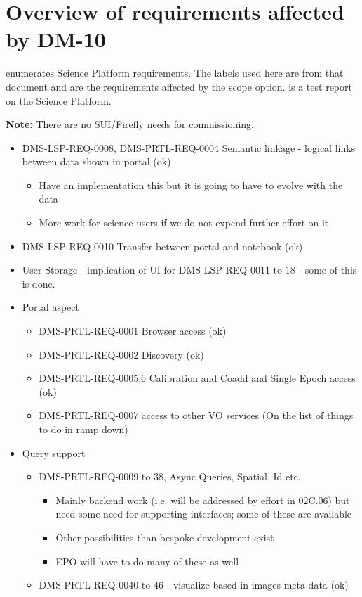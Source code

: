 \section { Overview of requirements affected by DM-10}\label{sect:reqs}
 enumerates Science Platform requirements.
The labels used here are from that document and are the requirements affected by the scope option.
 is a test report on the Science Platform.

\textbf{Note:} There are no SUI/Firefly needs for commissioning.
\begin{itemize}
\item DMS-LSP-REQ-0008, DMS-PRTL-REQ-0004 Semantic linkage - logical links between data shown in portal (ok)
\begin{itemize}
\item Have an implementation this but it is going to have to evolve with the data
\item More work for science users if we do not expend further effort on it
\end{itemize}

\item DMS-LSP-REQ-0010 Transfer between portal and notebook (ok)
\item User Storage - implication of UI for DMS-LSP-REQ-0011 to 18 - some of this is done.
\item Portal aspect
\begin{itemize}
\item DMS-PRTL-REQ-0001 Browser access (ok)
\item DMS-PRTL-REQ-0002 Discovery (ok)
\item DMS-PRTL-REQ-0005,6 Calibration and Coadd and Single Epoch access (ok)
\item DMS-PRTL-REQ-0007 access to other VO services (On the list of things to do in ramp down)
\end{itemize}

\item Query support
\begin{itemize}
\item DMS-PRTL-REQ-0009 to 38, Async Queries, Spatial, Id etc.
\begin{itemize}
\item Mainly backend work (i.e. will be addressed by effort in 02C.06) but need some need for supporting interfaces; some of these are available
\item Other possibilities than bespoke development exist
\item EPO will have to do many of these as well
\end{itemize}
\item DMS-PRTL-REQ-0040 to 46 - visualize based in images meta data (ok)
\end{itemize}



\end{itemize}
